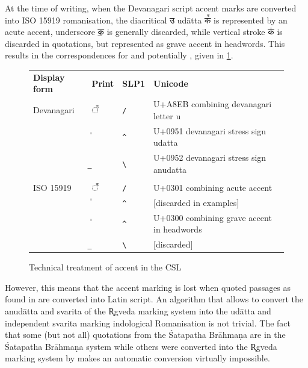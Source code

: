 At the time of writing, when the Devanagari script accent marks are converted into ISO 15919 romanisation, the diacritical {\devfont उ} udātta {\devfont क꣫} is represented by an acute accent, underscore {\devfont क॒} is generally discarded, while vertical stroke {\devfont क॑} is discarded in quotations, but represented as grave accent in headwords. This results in the correspondences for \citet{pwg} and potentially \citet{pw}, given in \ref{tab:csl1}.


\begin{figure}[!ht]
\begin{center}
\begingroup
\setlength{\tabcolsep}{10pt} %
\renewcommand{\arraystretch}{1.5} %
\begin{tabular}{llll}
{\bf Display form} & {\bf Print} & {\bf SLP1} & {\bf Unicode}\\
Devanagari & {\devfont ◌꣫} & \texttt{{/}} & U+A8EB {\sc combining devanagari letter u}\\
& {\devfont	॑}& \texttt{{\textasciicircum}} & U+0951 {\sc devanagari stress sign udatta}\\
& {\devfont	॒} & \texttt{{\textbackslash}}& U+0952 {\sc devanagari stress sign anudatta}\\
&&&\\
ISO 15919 & {\devfont ◌꣫} & \texttt{{/}} & U+0301 {\sc combining acute accent}\\
 & {\devfont	॑} & \texttt{{\textasciicircum}} & [{\sc discarded} in examples]\\
 & {\devfont	॑} & \texttt{{\textasciicircum}} & U+0300 {\sc combining grave accent} in headwords\\
 & {\devfont	॒} & \texttt{{\textbackslash}} & [{\sc discarded}]\\
\end{tabular}
\endgroup
\end{center}
\caption[Technical treatment of accent in the CSL]{\label{tab:csl1}Technical treatment of accent in the CSL}
\end{figure}


However, this means that the accent marking is lost when quoted passages as found in \citet{pwg} are converted into Latin script. An algorithm that allows to convert the anudātta and svarita of the R̥gveda marking system into the udātta and independent svarita marking indological Romanisation is not trivial. The fact that some (but not all) quotations from the Śatapatha Brāhmaṇa are in the Śatapatha Brāhmaṇa system while others were converted into the R̥gveda marking system by \citet{pwg} makes an automatic conversion virtually impossible.


